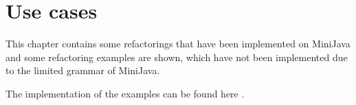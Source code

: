 \section{Use cases}

This chapter contains some refactorings that have been implemented on MiniJava and some refactoring examples are shown, 
which have not been implemented due to the limited grammar of MiniJava.

The implementation of the examples can be found here \cite{gp-modifiable-ast-examples}.




